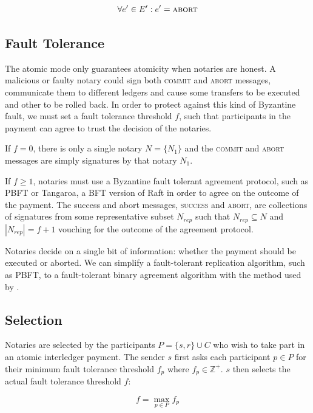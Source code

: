 \documentclass[letterpaper,twocolumn,10pt]{article}
\begin{document}
\begin{equation}
\forall e' \in E' : e' = \textsc{abort}
\end{equation}

\subsection{Fault Tolerance}

The atomic mode only guarantees atomicity when notaries are honest. A malicious or faulty notary could sign both \textsc{commit} and \textsc{abort} messages, communicate them to different ledgers and cause some transfers to be executed and other to be rolled back. In order to protect against this kind of Byzantine fault, we must set a fault tolerance threshold $f$, such that participants in the payment can agree to trust the decision of the notaries.

If $f = 0$, there is only a single notary $N = \{ N_1 \}$ and the \textsc{commit} and \textsc{abort} messages are simply signatures by that notary $N_1$.

If $f \geq 1$, notaries must use a Byzantine fault tolerant agreement protocol, such as PBFT \cite{castro1999practical} or Tangaroa, a BFT version of Raft \cite{copelandtangaroa} in order to agree on the outcome of the payment. The success and abort messages, \textsc{success} and \textsc{abort}, are collections of signatures from some representative subset $N_{rep}$ such that $N_{rep} \subseteq N$ and $|N_{rep}| = f+1$ vouching for the outcome of the agreement protocol.

Notaries decide on a single bit of information: whether the payment should be executed or aborted. We can simplify a fault-tolerant replication algorithm, such as PBFT, to a fault-tolerant binary agreement algorithm with the method used by \cite{mohan1983method}\cite{gray2006consensus}.

\subsection{Selection}

Notaries are selected by the participants $P = \{ s, r \} \cup C$ who wish to take part in an atomic interledger payment. The sender $s$ first asks each participant $p \in P$  for their minimum fault tolerance threshold $f_p$ where $f_p \in \mathbb{Z}^+$. $s$ then selects the actual fault tolerance threshold $f$:

\begin{equation}
f = \max_{p \in P} f_p
\end{equation}
\end{document}
